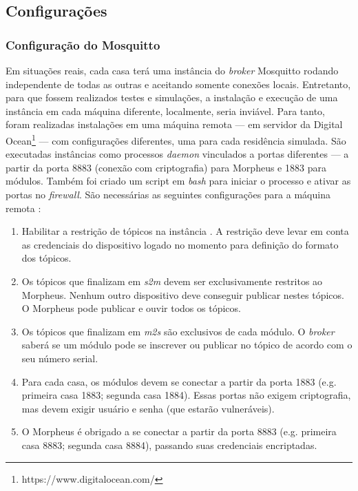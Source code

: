 \subsection{Configurações}

\subsubsection{Configuração do Mosquitto}

Em situações reais, cada casa terá uma instância do \emph{broker} Mosquitto rodando independente de todas as outras e aceitando somente conexões locais. Entretanto, para que fossem realizados testes e simulações, a instalação e execução de uma instância em cada máquina diferente, localmente, seria inviável. Para tanto, foram realizadas instalações em uma máquina remota --- em servidor da Digital Ocean\footnote{https://www.digitalocean.com/} --- com configurações diferentes, uma para cada residência simulada. São executadas instâncias como processos \emph{daemon} vinculados a portas diferentes --- a partir da porta 8883 (conexão com criptografia) para Morpheus e 1883 para módulos. Também foi criado um script em \emph{bash} para iniciar o processo e ativar as portas no \emph{firewall}. São necessárias as seguintes configurações para a máquina remota \cite{MQTTSecurity} \cite{PubSub}:

\begin{enumerate}
\item Habilitar a restrição de tópicos na instância \cite{topicRestriction}. A restrição deve levar em conta as credenciais do dispositivo logado no momento para definição do formato dos tópicos.

\item Os tópicos que finalizam em \emph{s2m} devem ser exclusivamente restritos ao Morpheus. Nenhum outro dispositivo deve conseguir publicar nestes tópicos. O Morpheus pode publicar e ouvir todos os tópicos.

\item Os tópicos que finalizam em \emph{m2s} são exclusivos de cada módulo. O \emph{broker} saberá se um módulo pode se inscrever ou publicar no tópico de acordo com o seu número serial.

\item Para cada casa, os módulos devem se conectar a partir da porta 1883 (e.g. primeira casa \textrightarrow{} 1883; segunda casa \textrightarrow{} 1884). Essas portas não exigem criptografia, mas devem exigir usuário e senha (que estarão vulneráveis).

\item O Morpheus é obrigado a se conectar a partir da porta 8883 (e.g. primeira casa \textrightarrow{} 8883; segunda casa \textrightarrow{} 8884), passando suas credenciais encriptadas.
\end{enumerate}

